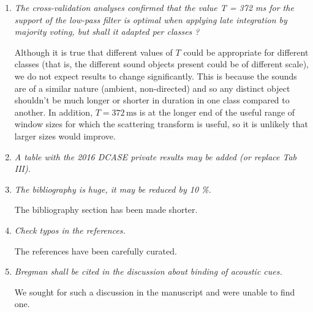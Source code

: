 \documentclass[10pt]{article}
\begin{document}
\begin{enumerate}

\item \emph{The cross-validation analyses confirmed that the value T = 372 ms for the support of the low-pass filter is optimal when applying late integration by majority voting, but shall it adapted per classes  ?}

Although it is true that different values of $T$ could be appropriate for different classes (that is, the different sound objects present could be of different scale), we do not expect results to change significantly. This is because the sounds are of a similar nature (ambient, non-directed) and so any distinct object shouldn't be much longer or shorter in duration in one class compared to another. In addition, $T = 372\,\mathrm{ms}$ is at the longer end of the useful range of window sizes for which the scattering transform is useful, so it is unlikely that larger sizes would improve.

\item \emph{A table with the 2016 DCASE private results may be added (or replace Tab III).}

\item \emph{The bibliography is huge, it may be reduced by 10 \%.}

The bibliography section has been made shorter. 

\item \emph{Check typos in the references.}

The references have been carefully curated.

\item \emph{Bregman shall be cited in the discussion about  binding of acoustic cues.}

We sought for such a discussion in the manuscript and were unable to find one.

\end{enumerate}
\end{document}
